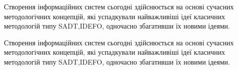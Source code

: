 \documentclass{lib/styles/default-style}
\begin{document}
Створення  інформаційних  систем  сьогодні  здійснюється  
на  основі сучасних  методологічних  концепцій,
які  успадкували  найважливіші  ідеї класичних методологій типу
SADT,IDEFO, одночасно збагативши їх новими ідеями.

Створення  інформаційних  систем  сьогодні  здійснюється  
на  основі сучасних  методологічних  концепцій,
які  успадкували  найважливіші  ідеї класичних методологій типу
SADT,IDEFO, одночасно збагативши їх новими ідеями.
\end{document}
